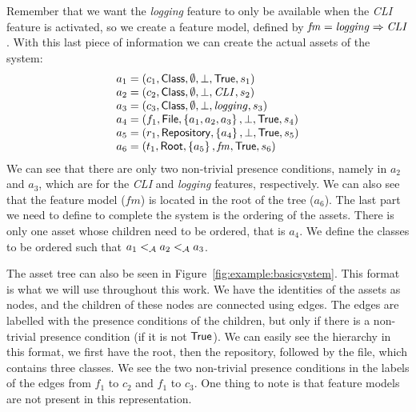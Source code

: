 Remember that we want the \emph{logging} feature to only be
available when the \emph{CLI} feature is activated, so we create a feature model,
defined by \( \mathit{fm} = \mathit{logging} \Rightarrow \mathit{CLI} \).
With this last piece of information we can create the actual assets of the system:
\[
  \begin{array}{l}
    a_1 = \left( c_1, {\sf Class}, \emptyset, \bot, {\sf True}, s_1 \right) \\
    a_2 = \left( c_2, {\sf Class}, \emptyset, \bot, \mathit{CLI}, s_2 \right) \\
    a_3 = \left( c_3, {\sf Class}, \emptyset, \bot, \mathit{logging}, s_3 \right) \\
    a_4 = \left( f_1, {\sf File}, \left\{ a_1, a_2, a_3 \right\}, \bot, {\sf True}, s_4 \right) \\
    a_5 = \left( r_1, {\sf Repository}, \left\{ a_4 \right\}, \bot, {\sf True}, s_5 \right) \\
    a_6 = \left( t_1, {\sf Root}, \left\{ a_5 \right\}, \mathit{fm}, {\sf True}, s_6 \right)
  \end{array}
\]
We can see that there are only two non-trivial presence conditions, namely in
$a_2$ and $a_3$, which are for the \emph{CLI} and \emph{logging} features,
respectively. We can also see that the feature model (\(\mathit{fm}\)) is
located in the root of the tree ($a_6$). The last part we need to define to
complete the system is the ordering of the assets. There is only one asset
whose children need to be ordered, that is $a_4$. We define the classes to be
ordered such that \(a_1 <_{\mathcal{A}} a_2 <_{\mathcal{A}} a_3 \).

The asset tree can also be seen in Figure~\ref{fig:example:basicsystem}. This
format is what we will use throughout this work. We have the identities of the
assets as nodes, and the children of these nodes are connected using edges. The edges
are labelled with the presence conditions of the children, but only if there is a
non-trivial presence condition (if it is not \({\sf True}\)). We can easily see the
hierarchy in this format, we first have the root, then the repository, followed by
the file, which contains three classes. We see the two non-trivial presence conditions
in the labels of the edges from $f_1$ to $c_2$ and $f_1$ to $c_3$. One thing to note is
that feature models are not present in this representation. 

